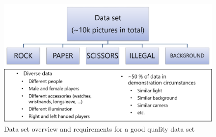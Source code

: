 \begin{figure}[!htb]
	\centering
		\includegraphics[width=\textwidth]{bilder/dataset_overview.png}
		\caption{Data set overview and requirements for a good quality data set}
		\label{fig:dataset_overview}
\end{figure}